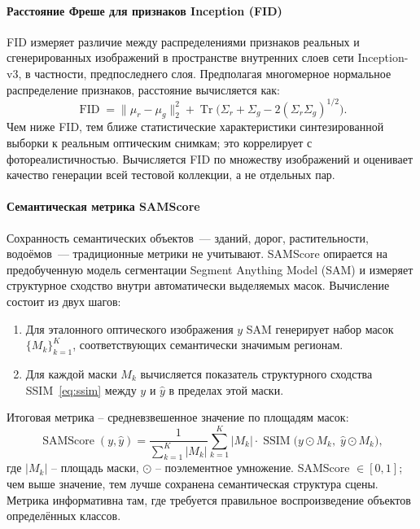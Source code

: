 \paragraph{Расстояние Фреше для признаков Inception (FID)}
FID \cite{heusel2017gans} измеряет различие между распределениями признаков реальных и сгенерированных изображений в пространстве внутренних слоев сети Inception-v3, в частности, предпоследнего слоя.
Предполагая многомерное нормальное распределение признаков, расстояние вычисляется как:
\begin{equation}
\operatorname{FID} = \|\mu_r - \mu_g\|_2^2 + \operatorname{Tr}\bigl(\Sigma_r + \Sigma_g - 2(\Sigma_r \Sigma_g)^{1/2}\bigr).
\label{eq:fid}
\end{equation}
Чем ниже FID, тем ближе статистические характеристики синтезированной выборки к реальным оптическим снимкам; это коррелирует с фотореалистичностью.
Вычисляется FID по множеству изображений и оценивает качество генерации всей тестовой коллекции, а не отдельных пар.

\paragraph{Семантическая метрика SAMScore}
Сохранность семантических объектов~--- зданий, дорог, растительности, водоёмов~--- традиционные метрики не учитывают.
SAMScore опирается на предобученную модель сегментации Segment Anything Model (SAM) \cite{kirillov2023segment} и измеряет структурное сходство внутри автоматически выделяемых масок.
Вычисление состоит из двух шагов:
\begin{enumerate}
    \item Для эталонного оптического изображения $y$ SAM генерирует набор масок $\{M_k\}_{k=1}^{K}$, соответствующих семантически значимым регионам.
    \item Для каждой маски $M_k$ вычисляется показатель структурного сходства SSIM~\eqref{eq:ssim} между $y$ и $\hat{y}$ в пределах этой маски.
\end{enumerate}
Итоговая метрика -- средневзвешенное значение по площадям масок:
\begin{equation}
\operatorname{SAMScore}(y, \hat{y}) = \frac{1}{\sum_{k=1}^{K} |M_k|} \sum_{k=1}^{K} |M_k| \cdot \operatorname{SSIM}\bigl(y \odot M_k,\; \hat{y} \odot M_k\bigr),
\label{eq:samscore}
\end{equation}
где $|M_k|$ -- площадь маски, $\odot$ -- поэлементное умножение. SAMScore $\in [0,1]$; чем выше значение, тем лучше сохранена семантическая структура сцены. Метрика информативна там, где требуется правильное воспроизведение объектов определённых классов.

